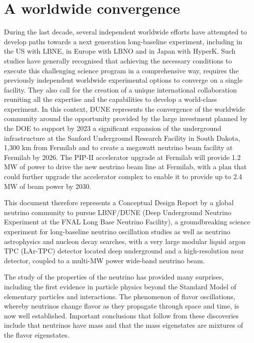 \section{A worldwide convergence}

During the last decade, several independent worldwide efforts have attempted to develop paths towards a next generation long-baseline experiment, including in the US with LBNE, in Europe with LBNO and in Japan with HyperK. Such  studies have generally recognised that achieving the necessary conditions to execute this challenging science program in a comprehensive way, requires the previously independent worldwide experimental options to converge on a single facility. They 
also call for the creation of a unique international collaboration reuniting all the expertise and the capabilities to develop a world-class experiment.
In this context, DUNE represents the convergence of the worldwide community around the opportunity provided by the large investment planned by the DOE to support by 2023 a significant expansion of the underground infrastructure at the Sanford Underground Research Facility in South Dakota, 1,300 km from Fermilab and to create a megawatt neutrino beam facility at Fermilab by 2026.  The PIP-II accelerator upgrade at Fermilab will provide 1.2 MW of power to drive the new neutrino beam line at Fermilab, with a plan that could further upgrade the 
accelerator complex to enable it to provide up to 2.4 MW of beam power by 2030.  

This document therefore represents 
a Conceptual Design Report by a global neutrino community to pursue 
LBNF/DUNE (Deep Underground Neutrino Experiment at the FNAL Long Base Neutrino Facility),
a groundbreaking science experiment for long-baseline neutrino oscillation studies as well as neutrino astrophysics and nucleon decay searches, with a very large modular liquid argon TPC (LAr-TPC) detector located deep underground and a high-resolution near detector, coupled to a  multi-MW power wide-band neutrino beam.

The study of the properties of the neutrino has provided many surprises, including the first evidence in particle physics beyond the Standard Model of elementary particles and interactions.   The phenomenon of flavor oscillations, whereby neutrinos change flavor as they propagate through space and time, is now well established. Important conclusions that follow from these discoveries include that neutrinos have mass and that the mass eigenstates are mixtures of the flavor eigenstates.

